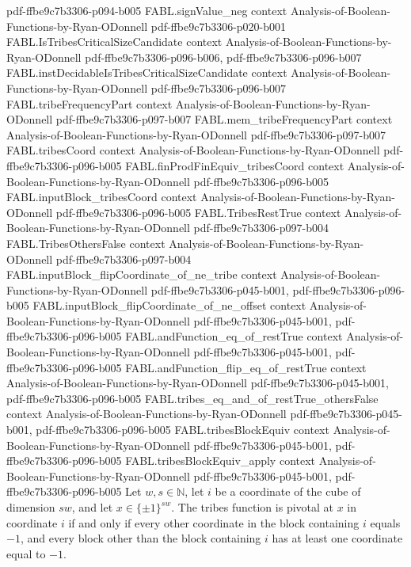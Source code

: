 \begin{theorem}
  {pdf-ffbe9c7b3306-p094-b005}
\proofstep
  {FABL.signValue_neg}
  {context}
  {Analysis-of-Boolean-Functions-by-Ryan-ODonnell}
  {pdf-ffbe9c7b3306-p020-b001}
\proofstep
  {FABL.IsTribesCriticalSizeCandidate}
  {context}
  {Analysis-of-Boolean-Functions-by-Ryan-ODonnell}
  {pdf-ffbe9c7b3306-p096-b006,
    pdf-ffbe9c7b3306-p096-b007}
\proofstep
  {FABL.instDecidableIsTribesCriticalSizeCandidate}
  {context}
  {Analysis-of-Boolean-Functions-by-Ryan-ODonnell}
  {pdf-ffbe9c7b3306-p096-b007}
\proofstep
  {FABL.tribeFrequencyPart}
  {context}
  {Analysis-of-Boolean-Functions-by-Ryan-ODonnell}
  {pdf-ffbe9c7b3306-p097-b007}
\proofstep
  {FABL.mem_tribeFrequencyPart}
  {context}
  {Analysis-of-Boolean-Functions-by-Ryan-ODonnell}
  {pdf-ffbe9c7b3306-p097-b007}
\proofstep
  {FABL.tribesCoord}
  {context}
  {Analysis-of-Boolean-Functions-by-Ryan-ODonnell}
  {pdf-ffbe9c7b3306-p096-b005}
\proofstep
  {FABL.finProdFinEquiv_tribesCoord}
  {context}
  {Analysis-of-Boolean-Functions-by-Ryan-ODonnell}
  {pdf-ffbe9c7b3306-p096-b005}
\proofstep
  {FABL.inputBlock_tribesCoord}
  {context}
  {Analysis-of-Boolean-Functions-by-Ryan-ODonnell}
  {pdf-ffbe9c7b3306-p096-b005}
\proofstep
  {FABL.TribesRestTrue}
  {context}
  {Analysis-of-Boolean-Functions-by-Ryan-ODonnell}
  {pdf-ffbe9c7b3306-p097-b004}
\proofstep
  {FABL.TribesOthersFalse}
  {context}
  {Analysis-of-Boolean-Functions-by-Ryan-ODonnell}
  {pdf-ffbe9c7b3306-p097-b004}
\proofstep
  {FABL.inputBlock_flipCoordinate_of_ne_tribe}
  {context}
  {Analysis-of-Boolean-Functions-by-Ryan-ODonnell}
  {pdf-ffbe9c7b3306-p045-b001,
    pdf-ffbe9c7b3306-p096-b005}
\proofstep
  {FABL.inputBlock_flipCoordinate_of_ne_offset}
  {context}
  {Analysis-of-Boolean-Functions-by-Ryan-ODonnell}
  {pdf-ffbe9c7b3306-p045-b001,
    pdf-ffbe9c7b3306-p096-b005}
\proofstep
  {FABL.andFunction_eq_of_restTrue}
  {context}
  {Analysis-of-Boolean-Functions-by-Ryan-ODonnell}
  {pdf-ffbe9c7b3306-p045-b001,
    pdf-ffbe9c7b3306-p096-b005}
\proofstep
  {FABL.andFunction_flip_eq_of_restTrue}
  {context}
  {Analysis-of-Boolean-Functions-by-Ryan-ODonnell}
  {pdf-ffbe9c7b3306-p045-b001,
    pdf-ffbe9c7b3306-p096-b005}
\proofstep
  {FABL.tribes_eq_and_of_restTrue_othersFalse}
  {context}
  {Analysis-of-Boolean-Functions-by-Ryan-ODonnell}
  {pdf-ffbe9c7b3306-p045-b001,
    pdf-ffbe9c7b3306-p096-b005}
\proofstep
  {FABL.tribesBlockEquiv}
  {context}
  {Analysis-of-Boolean-Functions-by-Ryan-ODonnell}
  {pdf-ffbe9c7b3306-p045-b001,
    pdf-ffbe9c7b3306-p096-b005}
\proofstep
  {FABL.tribesBlockEquiv_apply}
  {context}
  {Analysis-of-Boolean-Functions-by-Ryan-ODonnell}
  {pdf-ffbe9c7b3306-p045-b001,
    pdf-ffbe9c7b3306-p096-b005}
Let $w,s\in\mathbb N$, let $i$ be a coordinate of the cube of dimension $sw$, and let
$x\in\{\pm1\}^{sw}$. The tribes function is pivotal at $x$ in coordinate $i$ if and only
if every other coordinate in the block containing $i$ equals $-1$, and every block other
than the block containing $i$ has at least one coordinate equal to $-1$.
\end{theorem}


